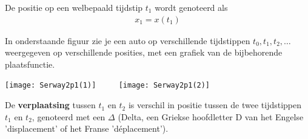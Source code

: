 \documentclass{ximera}
\begin{document}
De positie op een welbepaald tijdstip $t_1$ wordt genoteerd als 
\begin{eqnarray*}
x_1=x(t_1)
\end{eqnarray*}

In onderstaande figuur zie je een auto op verschillende tijdstippen $t_0,t_1, t_2,\ldots$ weergegeven op verschillende posities, met een grafiek van de bijbehorende plaatsfunctie.

\begin{image}
\texttt{[image: Serway2p1(1)]}
$\qquad$   %
\texttt{[image: Serway2p1(2)]}
\end{image}

\begin{image}
\end{image}





De \textbf{verplaatsing} tussen $t_1$ en $t_2$ is verschil in positie tussen de twee tijdstippen $t_1$ en $t_2$, genoteerd met een $\Delta$ (Delta, een Griekse hoofdletter D  van het Engelse 'displacement' of het Franse 'déplacement').
\end{document}
